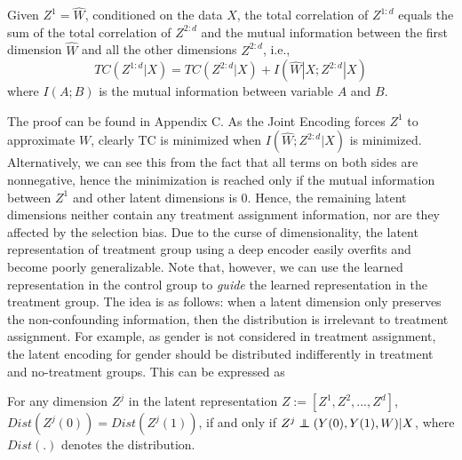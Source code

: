 \begin{proposition}
    Given $Z^1 = \hat{W}$, conditioned on the data $X$, the total correlation of $Z^{1:d}$ equals the sum of the total correlation of $Z^{2:d}$ and the mutual information between the first dimension $\hat{W}$ and all the other dimensions $Z^{2:d}$, i.e., 
\begin{equation}
        TC(Z^{1:d}|X) = TC(Z^{2:d}|X) 
    + I(\hat{W}|X;Z^{2:d}|X)
\end{equation}
where $I(A;B)$ is the mutual information between variable $A$ and $B$.
\end{proposition}

The proof can be found in Appendix C. As the Joint Encoding forces $Z^1$ to approximate $W$, clearly TC is minimized when $I(\hat{W};Z^{2:d}|X)$ is minimized. Alternatively, we can see this from the fact that all terms on both sides are nonnegative, hence the minimization is reached only if the mutual information between $Z^1$ and other latent dimensions is 0. 
Hence, the remaining latent dimensions neither contain any treatment assignment information, nor are they affected by the selection bias. Due to the curse of dimensionality, the latent representation of treatment group using a deep encoder easily overfits and become poorly generalizable. Note that, however, we can use the learned representation in the control group to \textit{guide} the learned representation in the treatment group. The idea is as follows: when a latent dimension only preserves the non-confounding information, then the distribution is irrelevant to treatment assignment. For example, as gender is not considered in treatment assignment, the latent encoding for gender should be distributed indifferently in treatment and no-treatment groups. This can be expressed as
\begin{proposition} For any dimension
$ Z^j$ in the latent representation $ Z:=[Z^1,Z^2,...,Z^d]$,
$ Dist(Z^j(0))=Dist(Z^j(1))$, if and only if $
    Z^j\perp\!\!\!\!\perp (Y(0),Y(1),W)|X 
$, where $Dist(.)$ denotes the distribution. 
\end{proposition}

